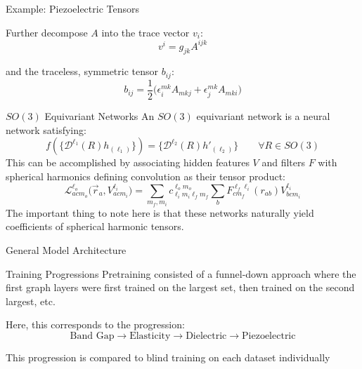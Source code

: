 \documentclass[11pt]{beamer}
\begin{document}
\begin{frame}{Example: Piezoelectric Tensors}
\begin{center}
Further decompose $A$ into the trace vector $v_i$:
$$
v^i =g_{jk}A^{ijk}
$$

and the traceless, symmetric tensor $b_{ij}$:
$$
b_{ij}=\frac{1}{2}\big(\epsilon_{i}^{mk}A_{mkj}+\epsilon_{j}^{mk}A_{mki}\big)
$$
\end{center}
\end{frame}
\begin{frame}{$SO(3)$ Equivariant Networks}
An $SO(3)$ equivariant network is a neural network  satisfying:
$$
f(\lbrace \mathcal{D}^{\ell_1}(R)h_{(\ell_1)}\rbrace) = \lbrace\mathcal{D}^{\ell_2}(R) h'_{(\ell_2)}\rbrace \quad\quad \forall R\in SO(3)
$$
This can be accomplished by associating hidden features $V$  and filters $F$ with spherical harmonics defining convolution as their tensor product:
$$
\mathcal{L}^{\ell_o}_{acm_o}\big(\vec{r}_a,V_{acm_i}^{\ell_i}\big) = \sum_{m_f,m_i}c_{\ell_im_i\ell_fm_f}^{\ell_o m_o}\sum_{b}F^{\ell_f\ell_i}_{cm_f}(r_{ab})V_{bcm_i}^{\ell_i}
$$
The important thing to note here is that these networks naturally yield coefficients of spherical harmonic tensors.
\end{frame}

\begin{frame}{General Model Architecture}
\begin{center}
\end{center}
\end{frame}

\begin{frame}{Training Progressions}
Pretraining consisted of a funnel-down approach where the first graph layers were first trained on the largest set, then trained on the second largest, etc.

\vspace{1cm}

Here, this corresponds to the progression:
$$
\text{Band Gap} \rightarrow \text{Elasticity} \rightarrow \text{Dielectric} \rightarrow \text{Piezoelectric}
$$

This progression is compared to blind training on each dataset individually
\end{frame}
\end{document}
